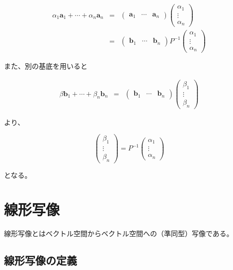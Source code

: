 \documentclass[dvipdfmx,autodetect-engine]{jsarticle}
\begin{document}
\begin{eqnarray*}
\alpha_1\bm{a}_1 + \cdots + \alpha_n\bm{a}_n &= &\begin{pmatrix}
\bm{a}_1 & \cdots & \bm{a}_n
\end{pmatrix}
\begin{pmatrix}
\alpha_1 \\
\vdots \\
\alpha_n
\end{pmatrix} \\
&= &\begin{pmatrix}
\bm{b}_1 & \cdots & \bm{b}_n
\end{pmatrix}
P^{-1}\begin{pmatrix}
\alpha_1 \\
\vdots \\
\alpha_n
\end{pmatrix}
\end{eqnarray*}

また、別の基底を用いると

\begin{eqnarray*}
\beta\bm{b}_1 + \cdots + \beta_n\bm{b}_n &= &\begin{pmatrix}
\bm{b}_1 & \cdots & \bm{b}_n
\end{pmatrix}
\begin{pmatrix}
\beta_1 \\
\vdots \\
\beta_n
\end{pmatrix}
\end{eqnarray*}

より、

$$
\begin{pmatrix}
\beta_1 \\
\vdots \\
\beta_n
\end{pmatrix} = 
P^{-1}\begin{pmatrix}
\alpha_1 \\
\vdots \\
\alpha_n
\end{pmatrix}
$$

となる。

\section{線形写像}

線形写像とはベクトル空間からベクトル空間への（準同型）写像である。

\subsection{線形写像の定義}
\end{document}
